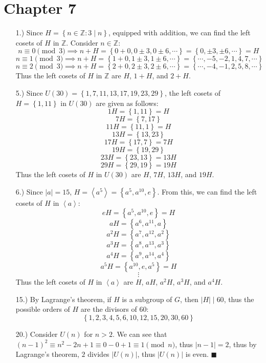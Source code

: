 \documentclass[11pt]{article}
\newcommand{\angleb}[1]{\left\langle#1\right\rangle} %
\newcommand{\vertb}[1]{\left\vert#1\right\vert}      %
\newcommand{\braces}[1]{\left\{#1\right\}}           %
\newcommand{\Z}{\mathbb{Z}}
\begin{document}
\pagestyle{fancy}
\fancyhead{}

\normalsize

\section*{Chapter 7}
\begin{itemize}
    \item [1.)] Since $H=\braces{n\in\Z:3\mid n}$, equipped with addition, we can find the left cosets of $H$ in $\Z$. Consider $n\in\Z$:
    \[n\equiv0\pmod{3}\implies n+H=\braces{0+0,0\pm3,0\pm6,\cdots}=\braces{0,\pm3,\pm6,\cdots}=H\]
    \[n\equiv1\pmod{3}\implies n+H=\braces{1+0,1\pm3,1\pm6,\cdots}=\braces{\cdots,-5,-2,1,4,7,\cdots}\]
    \[n\equiv2\pmod{3}\implies n+H=\braces{2+0,2\pm3,2\pm6,\cdots}=\braces{\cdots,-4,-1,2,5,8,\cdots}\]
    Thus the left cosets of $H$ in $\Z$ are $H$, $1+H$, and $2+H$.

    \item [5.)] Since $U(30)=\braces{1,7,11,13,17,19,23,29}$, the left cosets of $H=\braces{1,11}$ in $U(30)$ are given as follows:
    \[1H=\braces{1,11}=H\]
    \[7H=\braces{7,17}\]
    \[11H=\braces{11,1}=H\]
    \[13H=\braces{13,23}\]
    \[17H=\braces{17,7}=7H\]
    \[19H=\braces{19,29}\]
    \[23H=\braces{23,13}=13H\]
    \[29H=\braces{29,19}=19H\]
    Thus the left cosets of $H$ in $U(30)$ are $H$, $7H$, $13H$, and $19H$.

    \item [6.)] Since $\vertb{a}=15$, $H=\angleb{a^5}=\braces{a^5,a^{10},e}$. From this, we can find the left cosets of $H$ in $\angleb{a}$:
    \[eH=\braces{a^5,a^{10},e}=H\]
    \[aH=\braces{a^6,a^{11},a}\]
    \[a^2H=\braces{a^7,a^{12},a^2}\]
    \[a^3H=\braces{a^8,a^{13},a^3}\]
    \[a^4H=\braces{a^9,a^{14},a^4}\]
    \[a^5H=\braces{a^{10},e,a^5}=H\]
    \[\vdots\]
    Thus the left cosets of $H$ in $\angleb{a}$ are $H$, $aH$, $a^2H$, $a^3H$, and $a^4H$.

    \item [15.)] By Lagrange's theorem, if $H$ is a subgroup of $G$, then $\vertb{H}\mid60$, thus the possible orders of $H$ are the divisors of $60$:
    \[\braces{1,2,3,4,5,6,10,12,15,20,30,60}\]

    \item [20.)] Consider $U(n)$ for $n>2$. We can see that $(n-1)^2\equiv n^2-2n+1\equiv0-0+1\equiv1\pmod{n}$, thus $\vertb{n-1}=2$, thus by Lagrange's theorem, $2$ divides $\vertb{U(n)}$, thus $\vertb{U(n)}$ is even. $\blacksquare$
\end{itemize}
\end{document}
